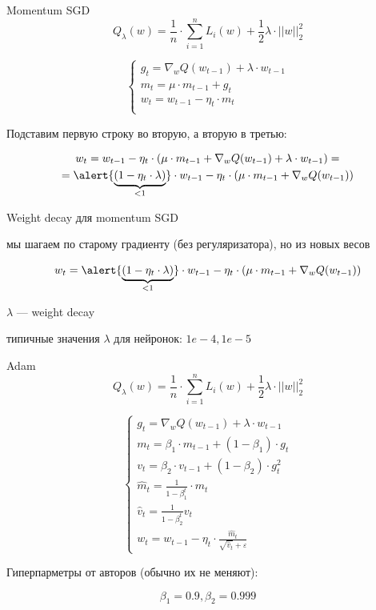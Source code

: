 \documentclass[notes,12pt, aspectratio=169]{beamer}
\newenvironment{wideitemize}{\itemize\addtolength{\itemsep}{10pt}}{\enditemize}
\begin{document}
\begin{frame}{Momentum SGD}
		$$
		Q_\lambda(w) = \frac{1}{n} \cdot \sum\limits_{i=1}^{n} L_i(w) + \frac{1}{2}\lambda \cdot ||w||^2_2
		$$
			
			
		$$
		\begin{cases}
			g_t = \nabla_w Q(w_{t-1}) + \lambda \cdot w_{t-1} \\
			m_t = \mu \cdot m_{t-1} + g_t\\
			w_t = w_{t-1} - \eta_t \cdot m_t \\
		\end{cases}
		$$
		
		Подставим первую строку во вторую, а вторую в третью:
		
		\begin{multline*}
			w_t = w_{t-1} - \eta_t \cdot (\mu \cdot m_{t-1} + \nabla_w Q(w_{t-1}) + \lambda \cdot w_{t-1}) = \\ =\alert{\underbrace{(1-\eta_t\cdot \lambda)}_{<1}}\cdot w_{t-1} - \eta_t\cdot(\mu\cdot m_{t-1} + \nabla_wQ(w_{t-1}))
		\end{multline*}
\end{frame}


\begin{frame}{Weight decay для momentum SGD}

	\begin{wideitemize}
		\item  мы шагаем по старому градиенту (без регуляризатора), но из новых весов
		
		$$
			w_t = \alert{\underbrace{(1-\eta_t\cdot \lambda)}_{<1}}\cdot w_{t-1} - \eta_t\cdot(\mu\cdot m_{t-1} + \nabla_wQ(w_{t-1}))
		$$
		
		\item $\lambda$   — weight decay
		
		\item  типичные значения $\lambda$ для нейронок:  $1e-4, 1e-5$
	\end{wideitemize}
\end{frame}


\begin{frame}{Adam}
	$$
		Q_\lambda(w) = \frac{1}{n} \cdot \sum\limits_{i=1}^{n} L_i(w) + \frac{1}{2}\lambda \cdot ||w||^2_2
	$$	

	$$
		\begin{cases}
			g_t = \nabla_w Q(w_{t-1}) + \lambda \cdot w_{t-1} \\
			m_t = \beta_1 \cdot m_{t-1} + (1-\beta_1) \cdot g_t \\
			v_t = \beta_2 \cdot v_{t-1} + (1-\beta_2) \cdot g_t^2\\
			\hat{m}_t = \frac{1}{1-\beta_1^t} \cdot m_t \\
			\hat{v}_t = \frac{1}{1-\beta_2^t}v_t \\
			w_t = w_{t-1} -\eta_t \cdot \frac{\hat{m}_t}{\sqrt{\hat{v}_t} + \varepsilon}
		\end{cases}
	$$
	
	Гиперпарметры от авторов (обычно их не меняют):
	
	$$
	\beta_1 = 0.9, \beta_2 = 0.999 
	$$
	
\end{frame}
\end{document}
